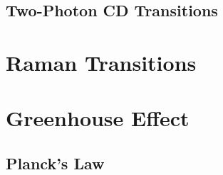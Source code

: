 \documentclass[9pt]{report}
\begin{document}
\subsection{Two-Photon CD Transitions}


\section{Raman Transitions}





\section{Greenhouse Effect}

\subsection{Planck's Law}
\end{document}
